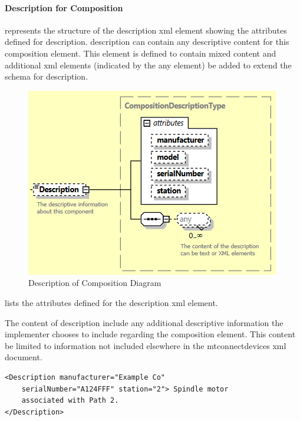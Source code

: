 

\paragraph{Description for Composition}\mbox{}

 represents the structure of the \gls{description} \gls{xml} element showing the attributes defined for \gls{description}.  \gls{description} can contain any descriptive content for this \gls{composition} element.  This element is defined to contain mixed content and additional \gls{xml} elements (indicated by the \gls{any} element) \may be added to extend the schema for \gls{description}.

\begin{figure}[ht]
  \centering
  \includegraphics[width=.75\textwidth]{figures/description-of-composition-schema-diagram.png}
  \caption{Description of Composition Diagram}
  \label{fig:description-of-composition-schema-diagram}
\end{figure}

\FloatBarrier

 lists the attributes defined for the \gls{description} \gls{xml} element. 



The content of \gls{description} \may include any additional descriptive information the implementer chooses to include regarding the \gls{composition} element.  This content \should be limited to information not included elsewhere in the \gls{mtconnectdevices} \gls{xml} document.

\begin{lstlisting}[firstnumber=1,escapechar=|,%
    caption={Example of  Description},label={lst:example-of-description-for-composition}]
<Description manufacturer="Example Co" 
    serialNumber="A124FFF" station="2"> Spindle motor
    associated with Path 2.
</Description>
\end{lstlisting}

